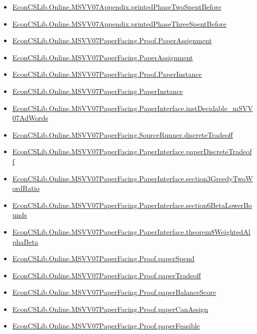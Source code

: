 \documentclass[10pt]{article}
\begin{document}
\begin{itemize}[leftmargin=1.2em]
\begin{itemize}[leftmargin=1.2em]
\item \hyperlink{library-prerequisite-b19d86e27b421b15}{EconCSLib.Online.MSVV07Appendix.printedPhaseTwoSpentBefore}
\item \hyperlink{library-prerequisite-c637386a961de464}{EconCSLib.Online.MSVV07Appendix.printedPhaseThreeSpentBefore}
\item \hyperlink{library-prerequisite-7d8dc5eaa0b37e7f}{EconCSLib.Online.MSVV07PaperFacing.Proof.PaperAssignment}
\item \hyperlink{library-prerequisite-218c2c11f253d71f}{EconCSLib.Online.MSVV07PaperFacing.PaperAssignment}
\item \hyperlink{library-prerequisite-ea14240d9f90aee9}{EconCSLib.Online.MSVV07PaperFacing.Proof.PaperInstance}
\item \hyperlink{library-prerequisite-f1658da22e1a2b37}{EconCSLib.Online.MSVV07PaperFacing.PaperInstance}
\item \hyperlink{library-prerequisite-cc452380af8cfd39}{EconCSLib.Online.MSVV07PaperFacing.PaperInterface.instDecidable\_mSVV07AdWords}
\item \hyperlink{library-prerequisite-06c8c7f0b0c2ef49}{EconCSLib.Online.MSVV07PaperFacing.SourceRunner.discreteTradeoff}
\item \hyperlink{library-prerequisite-2229d0cc5406f882}{EconCSLib.Online.MSVV07PaperFacing.PaperInterface.paperDiscreteTradeoff}
\item \hyperlink{library-prerequisite-714dad55bb312b6e}{EconCSLib.Online.MSVV07PaperFacing.PaperInterface.section3GreedyTwoWordRatio}
\item \hyperlink{library-prerequisite-671e2bf5832f897a}{EconCSLib.Online.MSVV07PaperFacing.PaperInterface.section6BetaLowerBounds}
\item \hyperlink{library-prerequisite-e742bc0b1c41d86d}{EconCSLib.Online.MSVV07PaperFacing.PaperInterface.theorem8WeightedAlphaBeta}
\item \hyperlink{library-prerequisite-486b3c7cec283d85}{EconCSLib.Online.MSVV07PaperFacing.Proof.paperSpend}
\item \hyperlink{library-prerequisite-b715563bff7fb4a5}{EconCSLib.Online.MSVV07PaperFacing.Proof.paperTradeoff}
\item \hyperlink{library-prerequisite-104a3c54f3911eda}{EconCSLib.Online.MSVV07PaperFacing.Proof.paperBalanceScore}
\item \hyperlink{library-prerequisite-0df6ec9b7d5504d1}{EconCSLib.Online.MSVV07PaperFacing.Proof.paperCanAssign}
\item \hyperlink{library-prerequisite-12f13b0433ae0616}{EconCSLib.Online.MSVV07PaperFacing.Proof.paperFeasible}

\end{itemize}
\end{itemize}
\end{document}
